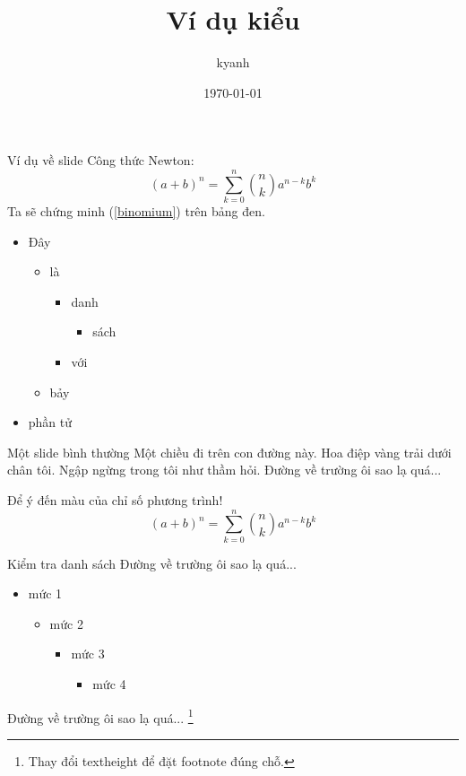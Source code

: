 \documentclass[
	style=\style,
	clock,
	size=11pt,
	paper=screen,
	orient=landscape
]{powerdot}
\title{Ví dụ kiểu \style}
\author{kyanh}
\date{\today}
\begin{document}
\newpage

\maketitle

\begin{slide}{Ví dụ về slide}
  Công thức Newton:
  \begin{equation}\label{binomium}
    (a+b)^n=\sum_{k=0}^n{n\choose k}a^{n-k}b^k
  \end{equation}
  Ta sẽ chứng minh (\ref{binomium}) trên bảng đen.\\
  \begin{itemize}
    \item Đây
    \begin{itemize}
      \item là
      \begin{itemize}
        \item danh
        \begin{itemize}
          \item sách
        \end{itemize}
        \item với
      \end{itemize}
      \item bảy
    \end{itemize}
    \item phần tử
  \end{itemize}
\end{slide}


\begin{slide}{Một slide bình thường}
  Một chiều đi trên con đường này. Hoa điệp vàng trải dưới chân tôi.
  Ngập ngừng trong tôi như thầm hỏi. Đường về trường ôi sao lạ quá...

  Để ý đến màu của chỉ số phương trình!
  \begin{equation}
    (a+b)^n=\sum_{k=0}^n{n\choose k}a^{n-k}b^k
  \end{equation}
\end{slide}

\begin{slide}{Kiểm tra danh sách}
  Đường về trường ôi sao lạ quá...
  \pause
  \begin{itemize}
    \item mức 1\pause
    \begin{itemize}
      \item mức 2\pause
      \begin{itemize}
        \item mức 3\pause
        \begin{itemize}
          \item mức 4
        \end{itemize}
      \end{itemize}
    \end{itemize}
  \end{itemize}
  Đường về trường ôi sao lạ quá...
  \footnote{Thay đổi textheight để đặt footnote đúng chỗ.}
\end{slide}
\end{document}
